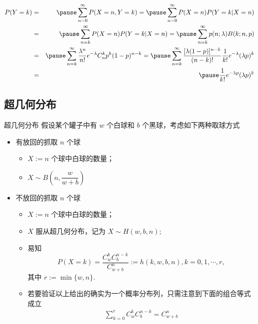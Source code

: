 \documentclass[Prob-All.tex]{subfiles}
\begin{document}
\begin{frame}
	\begin{eqnarray*}
		P(Y=k)&=&\pause \sum_{n=0}^\infty P(X=n, Y=k)=\pause \sum_{n=0}^\infty P(X=n) P(Y=k|X=n)\\
		&=&\pause \sum_{n=k}^\infty P(X=n) P(Y=k|X=n)=\pause \sum_{n=k}^\infty p(n;\lambda)B(k;n,p) \\
		&=&\pause \sum_{n=k}^\infty \dfrac{\lambda^n}{n!}e^{-\lambda}C_n^kp^k(1-p)^{n-k}=\pause \sum_{n=k}^\infty\dfrac{[\lambda(1-p)]^{n-k}}{(n-k)!}\dfrac{1}{k!}e^{-\lambda}(\lambda p)^k\\
		&=&\pause \dfrac{1}{k!}e^{-\lambda p}(\lambda p)^k\\
	\end{eqnarray*}
\end{frame}

\subsection{超几何分布}

\begin{frame}{超几何分布}
	假设某个罐子中有 $w$ 个白球和 $b$ 个黑球，考虑如下两种取球方式
	\begin{itemize}[<+-|alert@+>]
		\item 有放回的抓取 $n$ 个球
		      \begin{itemize}[<+-|alert@+>]
			      \item $X:=n$ 个球中白球的数量；
			            \vspace{0.1cm}
			      \item $X\sim B(n, \dfrac{w}{w+b})$
		      \end{itemize}

		\item 不放回的抓取 $n$ 个球
		      \begin{itemize}[<+-|alert@+>]
			      \item $X:=n$ 个球中白球的数量；
			      \item $X$ 服从超几何分布，记为 $X\sim H (w,b,n)$;
			      \item 易知
			            $$P(X=k)=\frac{C_w^kC_b^{n-k}}{C_{w+b}^n}:=h(k,w,b,n), k=0,1,\cdots,r,$$
			            其中 $r:=\min\{w,n\}$.
			      \item 若要验证以上给出的确实为一个概率分布列，只需注意到下面的组合等式成立
			            \begin{eqnarray*}
				            \sum_{k=0}^rC_w^kC_{b}^{n-k}=C_{w+b}^n
			            \end{eqnarray*}
		      \end{itemize}

	\end{itemize}
\end{frame}
\end{document}
